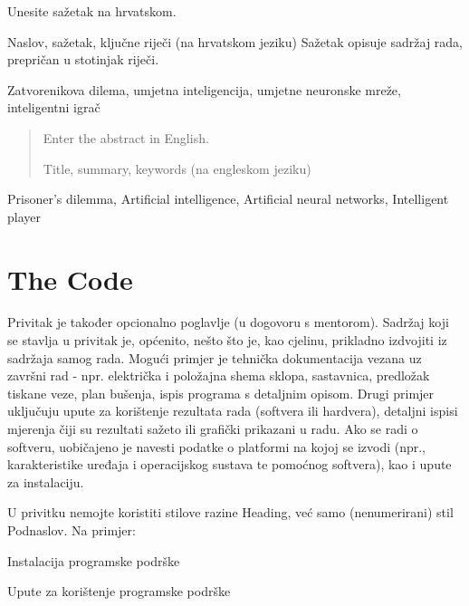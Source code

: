 \documentclass[zavrsnirad]{fer}
\begin{document}






\begin{sazetak}
  Unesite sažetak na hrvatskom.

	Naslov, sažetak, ključne riječi (na hrvatskom jeziku)
	Sažetak opisuje sadržaj rada, prepričan u stotinjak riječi. 

\end{sazetak}

\begin{kljucnerijeci}
	Zatvorenikova dilema, umjetna inteligencija, umjetne neuronske mreže, inteligentni igrač
\end{kljucnerijeci}


\begin{abstract}
  Enter the abstract in English.
  
  Title, summary, keywords (na engleskom jeziku)
  
\end{abstract}

\begin{keywords}
  Prisoner's dilemma, Artificial intelligence, Artificial neural networks, Intelligent player
\end{keywords}



\backmatter

\chapter{The Code}

	Privitak je također opcionalno poglavlje (u dogovoru s mentorom). 
	Sadržaj koji se stavlja u privitak je, općenito, nešto što je, kao cjelinu, prikladno izdvojiti iz sadržaja samog rada.
	Mogući primjer je tehnička dokumentacija vezana uz završni rad - npr. električka i položajna shema sklopa, sastavnica, predložak tiskane veze, plan bušenja, ispis programa s detaljnim opisom.
	Drugi primjer uključuju upute za korištenje rezultata rada (softvera ili hardvera), detaljni ispisi mjerenja čiji su rezultati sažeto ili grafički prikazani u radu. Ako se radi o softveru, uobičajeno je navesti podatke o platformi na kojoj se izvodi (npr., karakteristike uređaja i operacijskog sustava te pomoćnog softvera), kao i upute za instalaciju. 
	
	U privitku nemojte koristiti stilove razine Heading, već samo (nenumerirani) stil Podnaslov. 
	Na primjer:
	
	Instalacija programske podrške
	
	Upute za korištenje programske podrške


\end{document}
